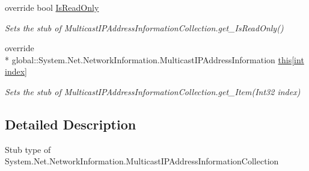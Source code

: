 \begin{DoxyCompactItemize}
override bool \hyperlink{class_system_1_1_net_1_1_network_information_1_1_fakes_1_1_stub_multicast_i_p_address_information_collection_a4526c5d59940c3aa6bd30369de655ca8}{Is\-Read\-Only}
\begin{DoxyCompactList}\small\item\em Sets the stub of Multicast\-I\-P\-Address\-Information\-Collection.\-get\-\_\-\-Is\-Read\-Only()\end{DoxyCompactList}\item 
override \\*
global\-::\-System.\-Net.\-Network\-Information.\-Multicast\-I\-P\-Address\-Information \hyperlink{class_system_1_1_net_1_1_network_information_1_1_fakes_1_1_stub_multicast_i_p_address_information_collection_aa5e92b35a76d4919061cd58e36ed5ce3}{this\mbox{[}int index\mbox{]}}
\begin{DoxyCompactList}\small\item\em Sets the stub of Multicast\-I\-P\-Address\-Information\-Collection.\-get\-\_\-\-Item(\-Int32 index)\end{DoxyCompactList}\end{DoxyCompactItemize}


\subsection{Detailed Description}
Stub type of System.\-Net.\-Network\-Information.\-Multicast\-I\-P\-Address\-Information\-Collection



